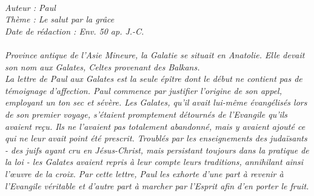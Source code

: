 \BFont
\noindent\hrulefill
{\footnotesize
\textit{
\bigskip
{\centering{}
\\Auteur : Paul
\\Thème : Le salut par la grâce
\\Date de rédaction : Env. 50 ap. J.-C.\\}
}
\textit{
\\Province antique de l’Asie Mineure, la Galatie se situait en Anatolie. Elle devait son nom aux Galates, Celtes provenant
des Balkans.
\\La lettre de Paul aux Galates est la seule épître dont le début ne contient pas de témoignage d’affection. Paul commence par justifier l’origine de son appel, employant un ton sec et sévère. Les Galates, qu’il avait lui-même évangélisés lors de son premier voyage, s’étaient promptement détournés de l’Evangile qu’ils avaient reçu. Ils ne l’avaient pas totalement abandonné, mais y avaient ajouté ce qui ne leur avait point été prescrit. Troublés par les enseignements des judaïsants - des juifs ayant cru en Jésus-Christ, mais persistant toujours dans la pratique de la loi - les Galates avaient repris à leur compte leurs traditions, annihilant ainsi l’œuvre de la croix. Par cette lettre, Paul les exhorte d’une part à revenir à l’Evangile véritable et d’autre part à marcher par l’Esprit afin d’en porter le fruit.\bigskip
}
}
\par\nobreak\noindent\hrulefill
